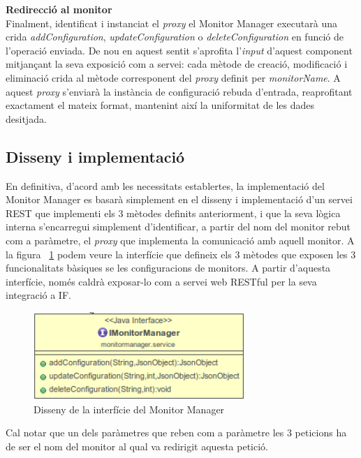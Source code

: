 \noindent \textbf{\large Redirecció al monitor}\\

\noindent Finalment, identificat i instanciat el \textit{proxy} el Monitor Manager executarà una crida \textit{addConfiguration}, \textit{updateConfiguration} o \textit{deleteConfiguration} en funció de l'operació enviada. De nou en aquest sentit s'aprofita l'\textit{input} d'aquest component mitjançant la seva exposició com a servei: cada mètode de creació, modificació i eliminació crida al mètode corresponent del \textit{proxy} definit per \textit{monitorName}. A aquest \textit{proxy} s'enviarà la instància de configuració rebuda d'entrada, reaprofitant exactament el mateix format, mantenint així la uniformitat de les dades desitjada.

\subsection{Disseny i implementació}

En definitiva, d'acord amb les necessitats establertes, la implementació del Monitor Manager es basarà simplement en el disseny i implementació d'un servei REST que implementi els 3 mètodes definits anteriorment, i que la seva lògica interna s'encarregui simplement d'identificar, a partir del nom del monitor rebut com a paràmetre, el \textit{proxy} que implementa la comunicació amb aquell monitor. A la figura ~\ref{fig:monitor-manager} podem veure la interfície que defineix els 3 mètodes que exposen les 3 funcionalitats bàsiques se les configuracions de monitors. A partir d'aquesta interfície, només caldrà exposar-lo com a servei web RESTful per la seva integració a IF.\\

\begin{figure}[!h]
\centering
\includegraphics[width=8cm]{Figures/monitor-manager-interface}
\decoRule
\caption{Disseny de la interfície del Monitor Manager}
\label{fig:monitor-manager}
\end{figure}

Cal notar que un dels paràmetres que reben com a paràmetre les 3 peticions ha de ser el nom del monitor al qual va redirigit aquesta petició. 

